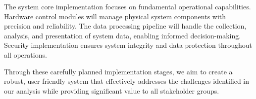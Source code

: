 The system core implementation focuses on fundamental operational capabilities. Hardware control modules will manage physical system components with precision and reliability. The data processing pipeline will handle the collection, analysis, and presentation of system data, enabling informed decision-making. Security implementation ensures system integrity and data protection throughout all operations.

Through these carefully planned implementation stages, we aim to create a robust, user-friendly system that effectively addresses the challenges identified in our analysis while providing significant value to all stakeholder groups.
